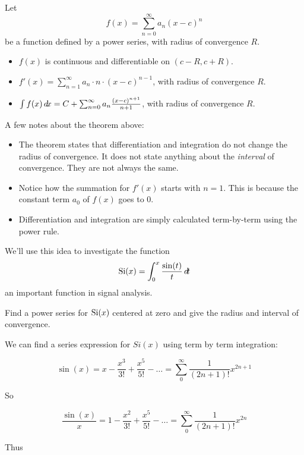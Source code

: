 \documentclass{ximera}
\begin{document}
\begin{theorem}
  Let
  \[
  f(x) = \sum_{n=0}^\infty a_n(x-c)^n
  \]
  be a function defined by a power series, with radius of convergence $R$.
  \begin{itemize}
  \item $f(x)$ is continuous and differentiable on $(c-R,c+R)$.
  \item	$f'(x) = \sum_{n=1}^\infty a_n\cdot n\cdot (x-c)^{n-1}$, with radius of convergence $R$.
  \item	$\int f(x) \mathop{}\!d\! x = C+\sum_{n=0}^\infty a_n\frac{(x-c)^{n+1}}{n+1}$, with radius of convergence $R$.
  \end{itemize}
\end{theorem}
A few notes about the theorem above:
\begin{itemize}
\item The theorem states that differentiation and integration do not
  change the radius of convergence. It does not state anything about
  the \textit{interval} of convergence. They are not always the same.
\item Notice how the summation for $f'(x)$ starts with $n=1$. This is
  because the constant term $a_0$ of $f(x)$ goes to $0$.
\item Differentiation and integration are simply calculated
  term-by-term using the power rule.
\end{itemize}

We'll use this idea to investigate the function 
\[
\operatorname{Si}(x) = \int_0^x \frac{\sin(t)}{t} \mathop{}\!d\! t
\]
an important function in signal analysis.

\begin{example}
  Find a power series for $\operatorname{Si}(x)$ centered at zero and give the
  radius and interval of convergence.
\end{example}

We can find a series expression for $Si(x)$ using term by term integration:

\[
\sin(x) = x-\frac{x^3}{3!}+\frac{x^5}{5!}-\dots = \sum_0^\infty \frac{1}{(2n+1)!} x^{2n+1}
\]

So 

\[
\frac{\sin(x)}{x} =1-\frac{x^2}{3!}+\frac{x^5}{5!}-\dots = \sum_0^\infty \frac{1}{(2n+1)!} x^{2n}
\]

Thus
\end{document}
